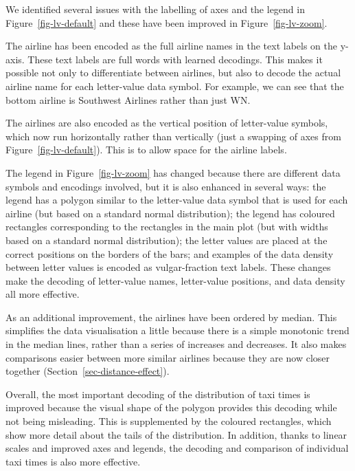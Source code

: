 \documentclass[
  letterpaper,
  DIV=11,
  numbers=noendperiod]{scrreprt}
\providecommand{\tightlist}{%
  \setlength{\itemsep}{0pt}\setlength{\parskip}{0pt}}
\begin{document}
\begin{description}
\tightlist
\item[Encoding encodings]
We identified several issues with the labelling of axes and the legend
in Figure~\ref{fig-lv-default} and these have been improved in
Figure~\ref{fig-lv-zoom}.
\end{description}

The airline has been encoded as the full airline names in the text
labels on the y-axis. These text labels are full words with learned
decodings. This makes it possible not only to differentiate between
airlines, but also to decode the actual airline name for each
letter-value data symbol. For example, we can see that the bottom
airline is Southwest Airlines rather than just WN.

The airlines are also encoded as the vertical position of letter-value
symbols, which now run horizontally rather than vertically (just a
swapping of axes from Figure~\ref{fig-lv-default}). This is to allow
space for the airline labels.

The legend in Figure~\ref{fig-lv-zoom} has changed because there are
different data symbols and encodings involved, but it is also enhanced
in several ways: the legend has a polygon similar to the letter-value
data symbol that is used for each airline (but based on a standard
normal distribution); the legend has coloured rectangles corresponding
to the rectangles in the main plot (but with widths based on a standard
normal distribution); the letter values are placed at the correct
positions on the borders of the bars; and examples of the data density
between letter values is encoded as vulgar-fraction text labels. These
changes make the decoding of letter-value names, letter-value positions,
and data density all more effective.

As an additional improvement, the airlines have been ordered by median.
This simplifies the data visualisation a little because there is a
simple monotonic trend in the median lines, rather than a series of
increases and decreases. It also makes comparisons easier between more
similar airlines because they are now closer together
(Section~\ref{sec-distance-effect}).

Overall, the most important decoding of the distribution of taxi times
is improved because the visual shape of the polygon provides this
decoding while not being misleading. This is supplemented by the
coloured rectangles, which show more detail about the tails of the
distribution. In addition, thanks to linear scales and improved axes and
legends, the decoding and comparison of individual taxi times is also
more effective.
\end{document}

